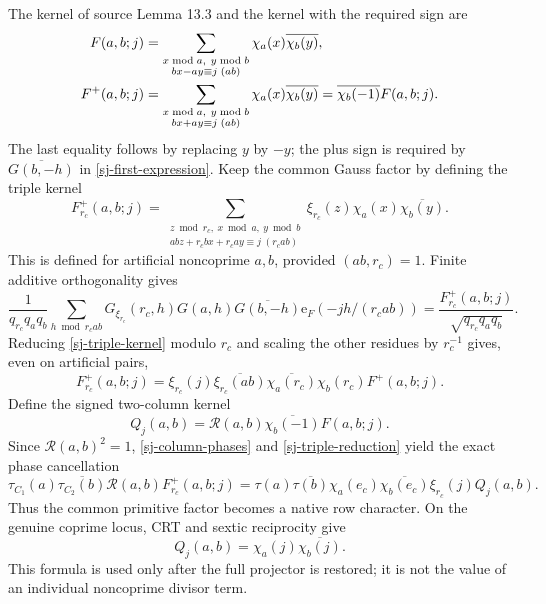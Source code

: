 \documentclass[11pt]{article}
\theoremstyle{definition}
\begin{document}
The kernel of source Lemma 13.3 and the kernel with the required sign are
\begin{align}
 F(a,b;j)&=\sum_{\substack{x\bmod a,\ y\bmod b\\
                          bx-ay\equiv j\; (ab)}}
                  \chi_a(x)\overline{\chi_b(y)},\notag\\
 F^+(a,b;j)&=\sum_{\substack{x\bmod a,\ y\bmod b\\
                          bx+ay\equiv j\; (ab)}}
                  \chi_a(x)\overline{\chi_b(y)}
             =\overline{\chi_b(-1)}F(a,b;j).
 \label{sj-plus-kernel}
\end{align}
The last equality follows by replacing $y$ by $-y$; the plus sign is
required by $\overline{G(b,-h)}$ in \eqref{sj-first-expression}.
Keep the common Gauss factor by defining the triple kernel
\begin{equation}\label{sj-triple-kernel}
 F^+_{r_c}(a,b;j)=
 \sum_{\substack{z\bmod r_c,\ x\bmod a,\ y\bmod b\\
 ab z+r_cb x+r_ca y\equiv j\; (r_cab)}}
 \xi_{r_c}(z)\chi_a(x)\overline{\chi_b(y)}.
\end{equation}
This is defined for artificial noncoprime $a,b$, provided $(ab,r_c)=1$.
Finite additive orthogonality gives
\begin{equation}\label{sj-finite-fourier}
 \frac1{q_{r_c}q_aq_b}\sum_{h\bmod r_cab}
 G_{\xi_{r_c}}(r_c,h)G(a,h)\overline{G(b,-h)}
 \mathrm e_F(-jh/(r_cab))
 =\frac{F^+_{r_c}(a,b;j)}{\sqrt{q_{r_c}q_aq_b}}.
\end{equation}
Reducing \eqref{sj-triple-kernel} modulo $r_c$ and scaling the other
residues by $r_c^{-1}$ gives, even on artificial pairs,
\begin{equation}\label{sj-triple-reduction}
 F^+_{r_c}(a,b;j)=\xi_{r_c}(j)\overline{\xi_{r_c}(ab)}
       \overline{\chi_a(r_c)}\chi_b(r_c)F^+(a,b;j).
\end{equation}
Define the signed two-column kernel
\begin{equation}\label{sj-Q-definition}
 Q_j(a,b)=\mathcal R(a,b)\overline{\chi_b(-1)}F(a,b;j).
\end{equation}
Since $\mathcal R(a,b)^2=1$, \eqref{sj-column-phases} and
\eqref{sj-triple-reduction} yield the exact phase cancellation
\begin{equation}\label{sj-phase-cancellation}
 \tau_{C_1}(a)\overline{\tau_{C_2}(b)}\mathcal R(a,b)F^+_{r_c}(a,b;j)
 =\tau(a)\overline{\tau(b)}\chi_a(e_c)\overline{\chi_b(e_c)}
             \xi_{r_c}(j)Q_j(a,b).
\end{equation}
Thus the common primitive factor becomes a native row character.
On the genuine coprime locus, CRT and sextic reciprocity give
\begin{equation}\label{sj-genuine-Q}
 Q_j(a,b)=\chi_a(j)\overline{\chi_b(j)}.
\end{equation}
This formula is used only after the full projector is restored; it is
not the value of an individual noncoprime divisor term.
\end{document}
